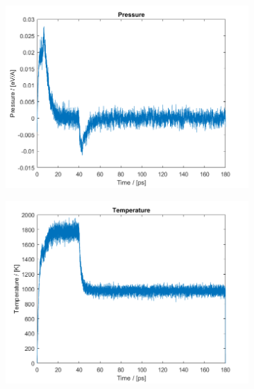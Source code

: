 \begin{figure}[H]
    \centering
    \captionsetup[subfigure]{justification=centering}
    \begin{subfigure}[b]{0.40\textwidth}
        \centering
        \includegraphics[width=\textwidth]{graphics/task4/pressure.png}
    \end{subfigure}
    \begin{subfigure}[b]{0.40\textwidth}
        \centering
        \includegraphics[width=\textwidth]{graphics/task4/temperature.png}

\end{subfigure}
\end{figure}
